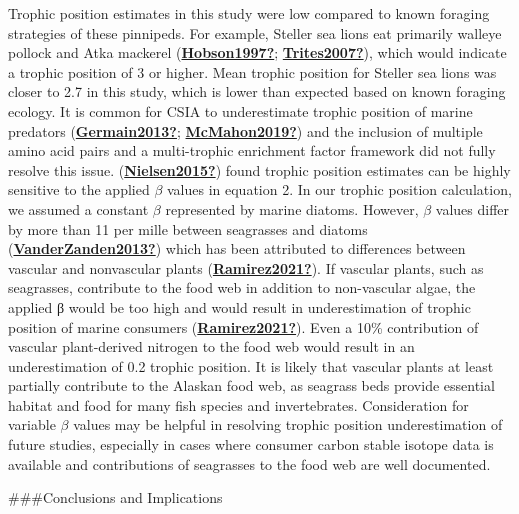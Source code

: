 \documentclass [11pt, proquest] {uwthesis}[2015/03/03]
\begin{document}
Trophic position estimates in this study were low compared to known foraging strategies of these pinnipeds. For example, Steller sea lions eat primarily walleye pollock and Atka mackerel (\protect\hyperlink{ref-Hobson1997}{\textbf{Hobson1997?}}; \protect\hyperlink{ref-Trites2007}{\textbf{Trites2007?}}), which would indicate a trophic position of 3 or higher. Mean trophic position for Steller sea lions was closer to 2.7 in this study, which is lower than expected based on known foraging ecology. It is common for CSIA to underestimate trophic position of marine predators (\protect\hyperlink{ref-Germain2013}{\textbf{Germain2013?}}; \protect\hyperlink{ref-McMahon2019}{\textbf{McMahon2019?}}) and the inclusion of multiple amino acid pairs and a multi-trophic enrichment factor framework did not fully resolve this issue. (\protect\hyperlink{ref-Nielsen2015}{\textbf{Nielsen2015?}}) found trophic position estimates can be highly sensitive to the applied \(\beta\) values in equation 2. In our trophic position calculation, we assumed a constant \(\beta\) represented by marine diatoms. However, \(\beta\) values differ by more than 11 per mille between seagrasses and diatoms (\protect\hyperlink{ref-VanderZanden2013}{\textbf{VanderZanden2013?}}) which has been attributed to differences between vascular and nonvascular plants (\protect\hyperlink{ref-Ramirez2021}{\textbf{Ramirez2021?}}). If vascular plants, such as seagrasses, contribute to the food web in addition to non-vascular algae, the applied β would be too high and would result in underestimation of trophic position of marine consumers (\protect\hyperlink{ref-Ramirez2021}{\textbf{Ramirez2021?}}). Even a 10\% contribution of vascular plant-derived nitrogen to the food web would result in an underestimation of 0.2 trophic position. It is likely that vascular plants at least partially contribute to the Alaskan food web, as seagrass beds provide essential habitat and food for many fish species and invertebrates. Consideration for variable \(\beta\) values may be helpful in resolving trophic position underestimation of future studies, especially in cases where consumer carbon stable isotope data is available and contributions of seagrasses to the food web are well documented.

\#\#\#Conclusions and Implications
\end{document}
